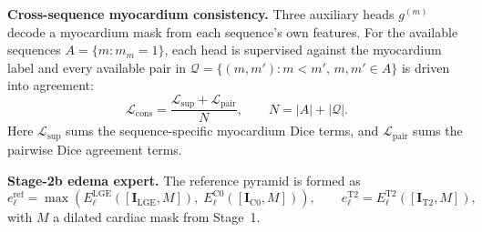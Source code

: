 \documentclass[runningheads]{llncs}
\newcommand{\LGE}{\mathrm{LGE}}
\newcommand{\Cz}{\mathrm{C0}}
\newcommand{\TT}{\mathrm{T2}}
\newcommand{\Img}{\mathbf{I}}
\begin{document}
\noindent\textbf{Cross-sequence myocardium consistency.} Three auxiliary heads
$g^{(m)}$ decode a myocardium mask from each sequence's own features. For the
available sequences $A=\{m:m_m=1\}$, each head is supervised against the
myocardium label and every available pair in
$\mathcal{Q}=\{(m,m'):m<m',\,m,m'\in A\}$ is driven into agreement:
\begin{equation}
\mathcal{L}_{\text{cons}}=\frac{\mathcal{L}_{\text{sup}}+
\mathcal{L}_{\text{pair}}}{N},\qquad N=|A|+|\mathcal{Q}|.
\end{equation}
Here $\mathcal{L}_{\text{sup}}$ sums the sequence-specific myocardium Dice
terms, and $\mathcal{L}_{\text{pair}}$ sums the pairwise Dice agreement terms.

\noindent\textbf{Stage-2b edema expert.} The reference pyramid is formed as
\begin{equation}
e^{\text{ref}}_\ell=\max\!\left(E^{\LGE}_\ell([\Img_\LGE,M]),\;E^{\Cz}_\ell([\Img_\Cz,M])\right),
\qquad
e^{\TT}_\ell=E^{\TT}_\ell([\Img_\TT,M]),
\end{equation}
with $M$ a dilated cardiac mask from Stage~1.
\end{document}
